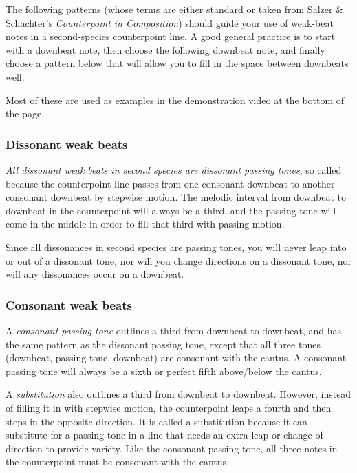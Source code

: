 \documentclass{book}
\begin{document}
The following patterns (whose terms are either standard or taken from Salzer
\& Schachter's \emph{Counterpoint in Composition}) should guide your use of
weak-beat notes in a second-species counterpoint line. A good general practice
is to start with a downbeat note, then choose the following downbeat note, and
finally choose a pattern below that will allow you to fill in the space
between downbeats well.

Most of these are used as examples in the demonstration video at the bottom of
the page.

\hypertarget{dissonant-weak-beats}{%
\subsubsection{Dissonant weak beats}\label{dissonant-weak-beats}}

\emph{All dissonant weak beats in second species are dissonant passing tones},
so called because the counterpoint line passes from one consonant downbeat to
another consonant downbeat by stepwise motion. The melodic interval from
downbeat to downbeat in the counterpoint will always be a third, and the
passing tone will come in the middle in order to fill that third with passing
motion.

Since all dissonances in second species are passing tones, you will never leap
into or out of a dissonant tone, nor will you change directions on a dissonant
tone, nor will any dissonances occur on a downbeat.

\hypertarget{consonant-weak-beats}{%
\subsubsection{Consonant weak beats}\label{consonant-weak-beats}}

A \emph{consonant passing tone} outlines a third from downbeat to downbeat,
and has the same pattern as the dissonant passing tone, except that all three
tones (downbeat, passing tone, downbeat) are consonant with the cantus. A
consonant passing tone will always be a sixth or perfect fifth above/below the
cantus.

A \emph{substitution} also outlines a third from downbeat to downbeat.
However, instead of filling it in with stepwise motion, the counterpoint leaps
a fourth and then steps in the opposite direction. It is called a substitution
because it can substitute for a passing tone in a line that needs an extra
leap or change of direction to provide variety. Like the consonant passing
tone, all three notes in the counterpoint must be consonant with the cantus.
\end{document}
